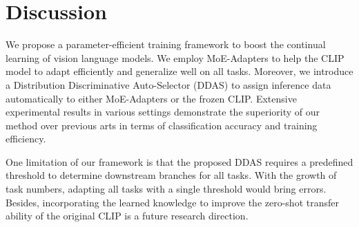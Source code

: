 \section{Discussion}
We propose a parameter-efficient training framework to boost the continual learning of vision language models. We employ MoE-Adapters to help the CLIP model to adapt efficiently and generalize well on all tasks. 
Moreover, we introduce a Distribution Discriminative Auto-Selector (DDAS) to assign inference data automatically to either MoE-Adapters or the frozen CLIP.  
Extensive experimental results in various settings demonstrate the superiority of our method over previous arts in terms of classification accuracy and training efficiency. 

One limitation of our framework is that the proposed DDAS requires a predefined threshold to determine downstream branches for all tasks. With the growth of task numbers, adapting all tasks with a single threshold would bring errors. Besides, incorporating the learned knowledge to improve the zero-shot transfer ability of the original CLIP is a future research direction.

